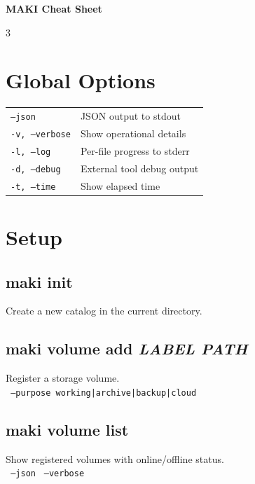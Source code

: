 \documentclass[a4paper,landscape,8pt]{article}
\newcommand{\cmd}[1]{\texttt{\footnotesize #1}}
\newcommand{\opt}[1]{\texttt{\scriptsize\color{maki-stone} #1}}
\begin{document}

\begin{center}
{\Large\bfseries\color{maki-salmon} MAKI Cheat Sheet} 
\end{center}
\vspace{-4pt}

\begin{multicols}{3}

\section{Global Options}
\begin{tabularx}{\columnwidth}{@{}lX@{}}
\cmd{--json} & JSON output to stdout \\
\cmd{-v, --verbose} & Show operational details \\
\cmd{-l, --log} & Per-file progress to stderr \\
\cmd{-d, --debug} & External tool debug output \\
\cmd{-t, --time} & Show elapsed time \\
\end{tabularx}

\section{Setup}

\subsection{maki init}
Create a new catalog in the current directory.

\subsection{maki volume add \textit{LABEL PATH}}
Register a storage volume. \\
\opt{--purpose working|archive|backup|cloud}

\subsection{maki volume list}
Show registered volumes with online/offline status. \\
\opt{--json} \opt{--verbose}


\end{multicols}
\end{document}
